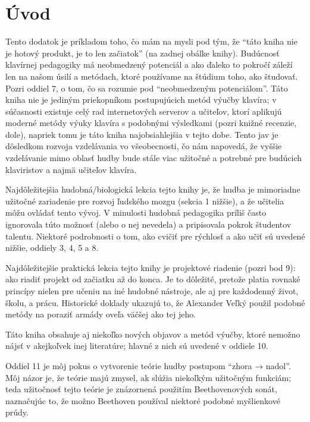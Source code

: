 \documentclass[11pt,a4paper%
]{article}
\begin{document}
\section*{Úvod}
Tento dodatok je príkladom toho, čo mám na mysli pod tým, že “táto kniha nie je hotový produkt, je to len začiatok” (na zadnej obálke knihy). Budúcnosť klavírnej pedagogiky má neobmedzený potenciál a ako ďaleko to pokročí záleží len na našom úsilí a metódach, ktoré používame na štúdium toho, ako študovať. Pozri oddiel 7, o tom, čo sa rozumie pod “neobmedzeným potenciálom”. Táto kniha nie je jediným priekopníkom postupujúcich metód výučby klavíra; v súčasnosti existuje celý rad internetových serverov a učiteľov, ktorí aplikujú moderné metódy výuky klavíra s podobnými výsledkami (pozri knižné recenzie, dole), napriek tomu je táto kniha najobsiahlejšia v tejto dobe. Tento jav je dôsledkom rozvoja vzdelávania vo všeobecnosti, čo nám napovedá, že vyššie vzdelávanie mimo oblasť hudby bude stále viac  užitočné a potrebné pre budúcich klaviristov a najmä učiteľov klavíra.

Najdôležitejšia hudobná/biologická lekcia tejto knihy je, že hudba je mimoriadne užitočné zariadenie pre rozvoj ľudského mozgu (sekcia 1 nižšie), a že učitelia môžu ovládať tento vývoj. V minulosti hudobná pedagogika príliš často ignorovala túto možnosť (alebo o nej nevedela) a pripisovala pokrok študentov talentu. Niektoré podrobnosti o tom, ako cvičiť pre rýchlosť a ako učiť sú uvedené nižšie, oddiely 3, 4, 5 a 8.

Najdôležitejšie praktická lekcia tejto knihy je projektové riadenie (pozri bod 9): ako riadiť projekt od začiatku až do konca. Je to dôležité, pretože platia rovnaké princípy nielen pre učeniu na 
iné hudobné nástroje, ale aj pre každodenný život, školu, a prácu. Historické doklady ukazujú to, že Alexander Veľký použil podobné metódy na poraziť armády oveľa väčšej ako tej jeho.

Táto kniha obsahuje aj niekoľko nových objavov a metód výučby, ktoré nemožno nájsť v akejkoľvek inej literatúre; hlavné z nich sú uvedené v oddiele 10.

Oddiel 11 je môj pokus o vytvorenie teórie hudby postupom “zhora → nadol”. Môj názor je, že teórie majú zmysel, ak slúžia niekoľkým užitočným funkciám; teda užitočnosť tejto teórie je znázornená použitím Beethovenových sonát, naznačujúc to, že možno Beethoven používal niektoré podobné myšlienkové prúdy.
\end{document}

